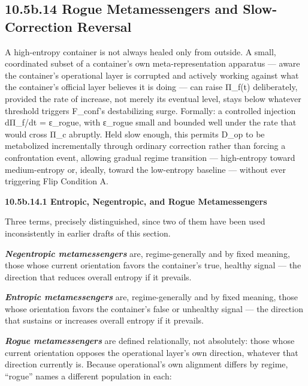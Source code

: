 \documentclass[
]{article}
\begin{document}
\hypertarget{b.14-rogue-metamessengers-and-slow-correction-reversal}{%
\subsection{10.5b.14 Rogue Metamessengers and Slow-Correction
Reversal}\label{b.14-rogue-metamessengers-and-slow-correction-reversal}}

A high-entropy container is not always healed only from outside. A
small, coordinated subset of a container's own meta-representation
apparatus --- aware the container's operational layer is corrupted and
actively working against what the container's official layer believes it
is doing --- can raise Π\_f(t) deliberately, provided the rate of
increase, not merely its eventual level, stays below whatever threshold
triggers F\_conf's destabilizing surge. Formally: a controlled injection
dΠ\_f/dt = ε\_rogue, with ε\_rogue small and bounded well under the rate
that would cross Π\_c abruptly. Held slow enough, this permits D\_op to
be metabolized incrementally through ordinary correction rather than
forcing a confrontation event, allowing gradual regime transition ---
high-entropy toward medium-entropy or, ideally, toward the low-entropy
baseline --- without ever triggering Flip Condition A.

\textbf{10.5b.14.1 Entropic, Negentropic, and Rogue Metamessengers}

Three terms, precisely distinguished, since two of them have been used
inconsistently in earlier drafts of this section.

\emph{\textbf{Negentropic metamessengers}} are, regime-generally and by
fixed meaning, those whose current orientation favors the container's
true, healthy signal --- the direction that reduces overall entropy if
it prevails.

\emph{\textbf{Entropic metamessengers}} are, regime-generally and by
fixed meaning, those whose orientation favors the container's false or
unhealthy signal --- the direction that sustains or increases overall
entropy if it prevails.

\emph{\textbf{Rogue metamessengers}} are defined relationally, not
absolutely: those whose current orientation opposes the operational
layer's own direction, whatever that direction currently is. Because
operational's own alignment differs by regime, ``rogue'' names a
different population in each:
\end{document}
